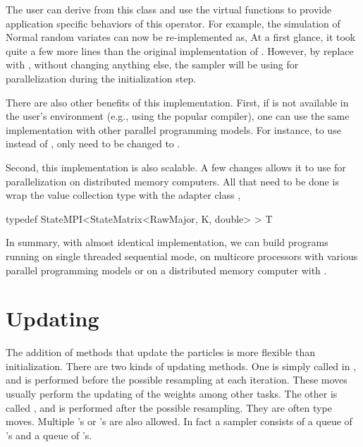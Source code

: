 The user can derive from this class and use the virtual functions to provide
application specific behaviors of this operator. For example, the simulation
of Normal random variates can now be re-implemented as,
At a first glance, it took quite a few more lines than the original
implementation of . However, by replace
 with , without changing
anything else, the sampler will be using \openmp for parallelization during
the initialization step.

There are also other benefits of this implementation. First, if \openmp is not
available in the user's \cpp environment (e.g., using the popular \clang
\cite{clang} compiler), one can use the same implementation with other
parallel programming models. For instance, to use \tbb instead of \openmp,
only  need to be changed to
.

Second, this implementation is also scalable. A few changes allows it to use
\mpi for parallelization on distributed memory computers. All that need to be
done is wrap the value collection type with the adapter class
,
\begin{cppcode}
typedef StateMPI<StateMatrix<RawMajor, K, double> > T
\end{cppcode}

In summary, with almost identical implementation, we can build programs
running on single threaded sequential mode, on multicore processors with
various parallel programming models or on a distributed memory computer with
\mpi.

\section{Updating}
\label{sec:Updating}

The addition of methods that update the particles is more flexible than
initialization. There are two kinds of updating methods. One is simply called
 in \vsmc, and is performed before the possible resampling at
each iteration. These moves usually perform the updating of the weights among
other tasks. The other is called , and is performed after the
possible resampling. They are often \mcmc type moves. Multiple
's or 's are also allowed. In fact a \vsmc
sampler consists of a queue of 's and a queue of
's.

